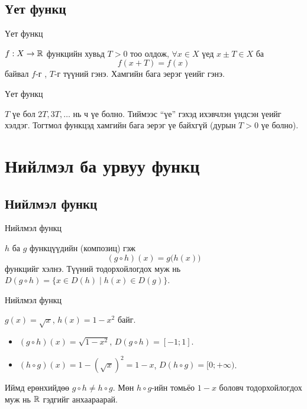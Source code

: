 \subsection{Үет функц}
\begin{frame}[allowframebreaks]{Үет функц}
\begin{definition}
$f:X\to\mathbb{R}$ функцийн хувьд $T>0$ тоо олдож, $\forall x\in X$ үед $x\pm T\in X$ ба
\[
f(x+T)=f(x)
\]
байвал $f$-г , $T$-г түүний  гэнэ. Хамгийн бага эерэг үеийг
 гэнэ.
\end{definition}
\end{frame}

\begin{frame}[allowframebreaks]{Үет функц}
\begin{remark}
$T$ үе бол $2T, 3T,\ldots$ нь ч үе болно. Тиймээс ``үе'' гэхэд ихэвчлэн үндсэн үеийг хэлдэг.
Тогтмол функцэд хамгийн бага эерэг үе байхгүй (дурын $T>0$ үе болно).
\end{remark}
\end{frame}

\section{Нийлмэл ба урвуу функц}
\subsection{Нийлмэл функц}
\begin{frame}[allowframebreaks]{Нийлмэл функц}
\begin{definition}
$h$ ба $g$ функцүүдийн  (композиц) гэж
\[
(g\circ h)(x)=g\bigl(h(x)\bigr)
\]
функцийг хэлнэ. Түүний тодорхойлогдох муж нь
$D(g\circ h)=\{x\in D(h)\mid h(x)\in D(g)\}$.
\end{definition}
\end{frame}

\begin{frame}[allowframebreaks]{Нийлмэл функц}
\begin{example}
$g(x)=\sqrt{x}$, $h(x)=1-x^2$ байг.
\begin{itemize}
  \item $(g\circ h)(x)=\sqrt{1-x^2}$, \quad $D(g\circ h)=[-1;1]$.
  \item $(h\circ g)(x)=1-(\sqrt{x})^2=1-x$, \quad $D(h\circ g)=[0;+\infty)$.
\end{itemize}
Иймд ерөнхийдөө $g\circ h\neq h\circ g$. Мөн $h\circ g$-ийн томьёо $1-x$ боловч
тодорхойлогдох муж нь $\mathbb{R}$  гэдгийг анхаараарай.
\end{example}
\end{frame}

